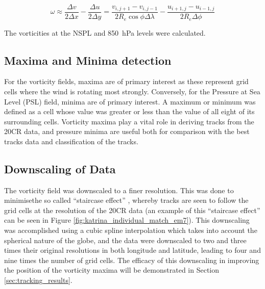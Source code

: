 \documentclass[pdftex,12pt,a4paper]{report}
\begin{document}
\begin{equation}
    \omega \approx \frac{\Delta v}{2 \Delta x} - \frac{\Delta u}{2 \Delta y} = \frac{v_{i,j+1} - v_{i,j-1}}{2 R_e \cos{\phi} \Delta \lambda} - \frac{u_{i+1,j} - u_{i-1,j}}{2 R_e \Delta \phi }
    \label{eqn:vorticity_2nd_order}
\end{equation}

The vorticities at the NSPL and \SI{850}{hPa} levels were calculated.

\subsection{Maxima and Minima detection}
\label{sec:methods_maxima_minima}

For the vorticity fields, maxima are of primary interest as these represent grid cells where the
wind is rotating most strongly. Conversely, for the Pressure at Sea Level (PSL) field, minima are of
primary interest. A maximum or minimum was defined as a cell whose value was greater or less than
the value of all eight of its surrounding cells. Vorticity maxima play a vital role in deriving
tracks from the 20CR data, and pressure minima are useful both for comparison with the best tracks
data and classification of the tracks.

\subsection{Downscaling of Data}

The vorticity field was downscaled to a finer resolution. This was done to minimisethe so called
``staircase effect'' \parencite{hodges1994general}, whereby tracks are seen to follow the grid cells
at the resolution of the 20CR data (an example of this ``staircase effect'' can be seen in Figure
\ref{fig:katrina_individual_match_em7}).  This downscaling was accomplished using a cubic spline
interpolation which takes into account the spherical nature of the globe, and the data were
downscaled to two and three times their original resolutions in both longitude and latitude, leading
to four and nine times the number of grid cells. The efficacy of this downscaling in improving the
position of the vorticity maxima will be demonstrated in Section \ref{sec:tracking_results}.

\end{document}
